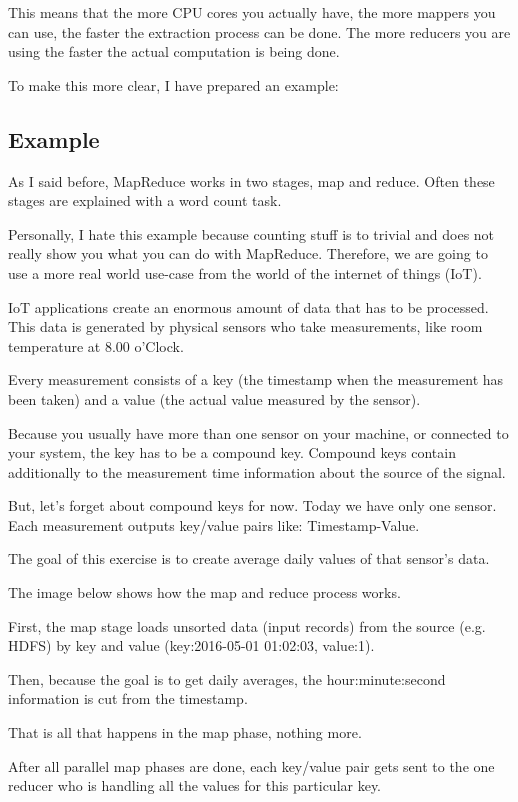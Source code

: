 \documentclass[12pt, numbers=noenddot]{scrreprt} %
\begin{document}
This means that the more CPU cores you actually have, the more mappers you can use, the faster the extraction process can be done. The more reducers you are using the faster the actual computation is being done.

To make this more clear, I have prepared an example:

\subsection{Example}
As I said before, MapReduce works in two stages, map and reduce. Often these stages are explained with a word count task.

Personally, I hate this example because counting stuff is to trivial and does not really show you what you can do with MapReduce. Therefore, we are going to use a more real world use-case from the world of the internet of things (IoT).

IoT applications create an enormous amount of data that has to be processed. This data is generated by physical sensors who take measurements, like room temperature at 8.00 o’Clock.

Every measurement consists of a key (the timestamp when the measurement has been taken) and a value (the actual value measured by the sensor).

Because you usually have more than one sensor on your machine, or connected to your system, the key has to be a compound key. Compound keys contain additionally to the measurement time information about the source of the signal.

But, let’s forget about compound keys for now. Today we have only one sensor. Each measurement outputs key/value pairs like: Timestamp-Value.

The goal of this exercise is to create average daily values of that sensor’s data.

The image below shows how the map and reduce process works.

First, the map stage loads unsorted data (input records) from the source (e.g. HDFS) by key and value (key:2016-05-01 01:02:03, value:1).

Then, because the goal is to get daily averages, the hour:minute:second information is cut from the timestamp.

That is all that happens in the map phase, nothing more.

After all parallel map phases are done, each key/value pair gets sent to the one reducer who is handling all the values for this particular key.
\end{document}
